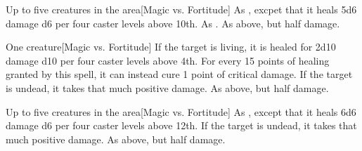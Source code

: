 \begin{spellheader}
    \spellrng{\rngclose}
\end{spellheader}
\begin{spelleffects}
    \begin{spelltargets}{Up to five creatures in the area}[Magic vs. Fortitude]
        \spelleffect As , excpet that it heals 5d6 damage \add d6 per four caster levels above 10th.
        \spellsuccess As .
        \spellfailure As above, but half damage.
    \end{spelltargets}
\end{spelleffects}

\begin{spellheader}
    \spellrng{\rngclose}
\end{spellheader}
\begin{spelleffects}
    \begin{spelltarget}{One creature}[Magic vs. Fortitude]
        \spelleffect If the target is living, it is healed for 2d10 damage \add d10 per four caster levels above 4th. For every 15 points of healing granted by this spell, it can instead cure 1 point of critical damage.
        \spellsuccess If the target is undead, it takes that much positive damage.
        \spellfailure As above, but half damage.
    \end{spelltarget}
\end{spelleffects}

\begin{spellheader}
\end{spellheader}
\begin{spelleffects}
    \begin{spelltargets}{Up to five creatures in the area}[Magic vs. Fortitude]
        \spelleffect As , except that it heals 6d6 damage \add d6 per four caster levels above 12th.
        \spellsuccess If the target is undead, it takes that much positive damage.
        \spellfailure As above, but half damage.
    \end{spelltargets}
\end{spelleffects}

